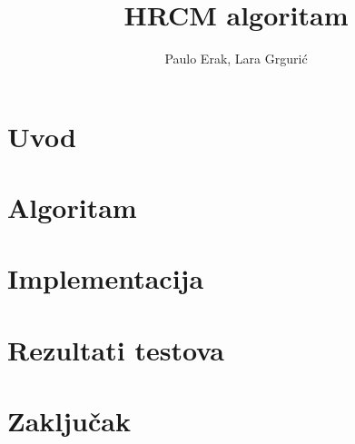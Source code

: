 \documentclass[times, utf8, seminar,numeric]{fer}
\begin{document}
\title{HRCM algoritam}

\author{Paulo Erak, Lara Grgurić}


\maketitle

\tableofcontents

\chapter{Uvod}


\chapter{Algoritam}


\chapter{Implementacija}


\chapter{Rezultati testova}


\chapter{Zaključak}





\end{document}
